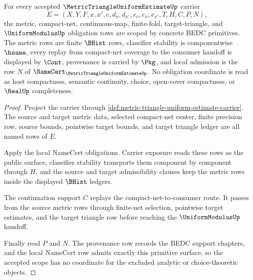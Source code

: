 \begin{theorem}
\label{thm:metric-triangle-uniform-estimate-primitive-scope}
For every accepted $\MetricTriangleUniformEstimateUp$ carrier
$$
E=(X,Y,F,x,x',c,d_x,d_{x'},e_c,e_x,e_{x'},T,H,C,P,N),
$$
the metric, compact-net, continuous-map, finite-fold, target-triangle, and $\UniformModulusUp$ obligation rows are scoped by concrete BEDC primitives. The metric rows are finite $\BHist$ rows, classifier stability is componentwise $\hsame$, every replay from compact-net coverage to the consumer handoff is displayed by $\Cont$, provenance is carried by $\Pkg$, and local admission is the row $N$ of $\NameCert_{\MetricTriangleUniformEstimateUp}$. No obligation coordinate is read as host compactness, semantic continuity, choice, open-cover compactness, or $\RealUp$ completeness.
\end{theorem}
\begin{proof}
Project the carrier through \autoref{def:metric-triangle-uniform-estimate-carrier}. The source and target metric data, selected compact-net center, finite precision row, source bounds, pointwise target bounds, and target triangle ledger are all named rows of $E$.

Apply the local NameCert obligations. Carrier exposure reads these rows as the public surface, classifier stability transports them component by component through $H$, and the source and target admissibility clauses keep the metric rows inside the displayed $\BHist$ ledgers.

The continuation support $C$ replays the compact-net-to-consumer route. It passes from the source metric rows through finite-net selection, pointwise target estimates, and the target triangle row before reaching the $\UniformModulusUp$ handoff.

Finally read $P$ and $N$. The provenance row records the BEDC support chapters, and the local NameCert row admits exactly this primitive surface, so the accepted scope has no coordinate for the excluded analytic or choice-theoretic objects.
\end{proof}


